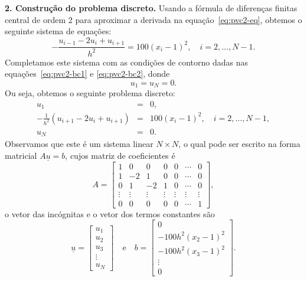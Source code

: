 \begin{sol}
{\bf 2. Construção do problema discreto.} Usando a fórmula de diferenças finitas central de ordem 2 para aproximar a derivada na equação~\eqref{eq:pvc2-eq}, obtemos o seguinte sistema de equações:
\begin{equation*}
  - \frac{u_{i-1} - 2u_i + u_{i+1}}{h^2} = 100(x_i - 1)^2,\quad i = 2, \dotsc, N-1.
\end{equation*}
Completamos este sistema com as condições de contorno dadas nas equações~\eqref{eq:pvc2-bc1} e \eqref{eq:pvc2-bc2}, donde
\begin{equation*}
  u_1 = u_N = 0.
\end{equation*}
Ou seja, obtemos o seguinte problema discreto:
\begin{eqnarray}
  u_1 &=& 0,\label{eq:pvc2_disc_bc1}\\
  -\frac{1}{h^2}\left(u_{i+1} - 2u_i + u_{i+1}\right) &=& 100(x_i-1)^2,\quad i=2, \dotsc, N-1,\\
  u_N &=& 0.\label{eq:pvc2_disc_bc2}
\end{eqnarray}
Observamos que este é um sistema linear $N\times N$, o qual pode ser escrito na forma matricial $A\underline{u} = b$, cujos matriz de coeficientes é
\begin{equation*}
  A = 
  \begin{bmatrix}
    1 & 0 & 0 & 0 & 0 & \cdots & 0\\
    1 & -2 & 1 & 0 & 0 & \cdots & 0\\
    0 & 1 & -2 & 1 & 0 & \cdots & 0\\
    \vdots & \vdots & \vdots & \vdots & \vdots & \vdots & \vdots\\
    0 & 0 & 0 & 0 & 0 & \cdots & 1
  \end{bmatrix},
\end{equation*}
o vetor das incógnitas e o vetor dos termos constantes são
\begin{equation*}
  \underline{u} =
  \begin{bmatrix}
    u_1\\
    u_2\\
    u_3\\
    \vdots\\
    u_N
  \end{bmatrix}\quad\text{e}\quad
  b =
  \begin{bmatrix}
    0\\
    -100h^{2}(x_2-1)^2\\
    -100h^{2}(x_3-1)^2\\
    \vdots\\
    0
  \end{bmatrix}.
\end{equation*}


\end{sol}
